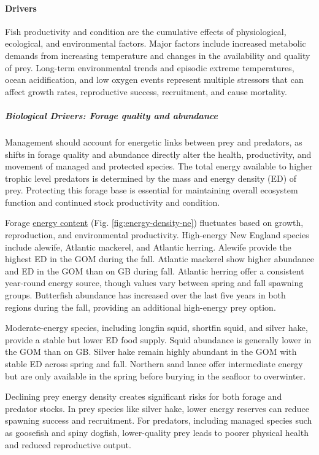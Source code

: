 \documentclass[
  10pt,
]{article}
\begin{document}
\paragraph{Drivers}\label{drivers-2}

Fish productivity and condition are the cumulative effects of physiological, ecological, and environmental factors. Major factors include increased metabolic demands from increasing temperature and changes in the availability and quality of prey. Long-term environmental trends and episodic extreme temperatures, ocean acidification, and low oxygen events represent multiple stressors that can affect growth rates, reproductive success, recruitment, and cause mortality.

\subparagraph{Biological Drivers: Forage quality and abundance}\label{biological-drivers-forage-quality-and-abundance}

Management should account for energetic links between prey and predators, as shifts in forage quality and abundance directly alter the health, productivity, and movement of managed and protected species. The total energy available to higher trophic level predators is determined by the mass and energy density (ED) of prey. Protecting this forage base is essential for maintaining overall ecosystem function and continued stock productivity and condition.

Forage \href{https://noaa-edab.github.io/catalog/energy_density.html}{energy content} (Fig. \ref{fig:energy-density-ne}) fluctuates based on growth, reproduction, and environmental productivity. High-energy New England species include alewife, Atlantic mackerel, and Atlantic herring. Alewife provide the highest ED in the GOM during the fall. Atlantic mackerel show higher abundance and ED in the GOM than on GB during fall. Atlantic herring offer a consistent year-round energy source, though values vary between spring and fall spawning groups. Butterfish abundance has increased over the last five years in both regions during the fall, providing an additional high-energy prey option.

Moderate-energy species, including longfin squid, shortfin squid, and silver hake, provide a stable but lower ED food supply. Squid abundance is generally lower in the GOM than on GB. Silver hake remain highly abundant in the GOM with stable ED across spring and fall. Northern sand lance offer intermediate energy but are only available in the spring before burying in the seafloor to overwinter.

Declining prey energy density creates significant risks for both forage and predator stocks. In prey species like silver hake, lower energy reserves can reduce spawning success and recruitment. For predators, including managed species such as goosefish and spiny dogfish, lower-quality prey leads to poorer physical health and reduced reproductive output.
\end{document}
